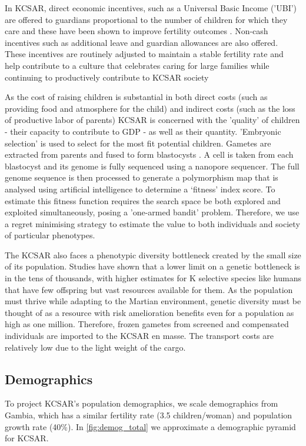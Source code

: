 \documentclass[fleqn,10pt]{Stylesheet} %
\begin{document}
In KCSAR, direct economic incentives, such as a Universal Basic Income ('UBI') are offered to guardians proportional to the number of children for which they care and these have been shown to improve fertility outcomes \cite{Kalwij, Bjorklund}. Non-cash incentives such as additional leave and guardian allowances are also offered. These incentives are routinely adjusted to maintain a stable fertility rate and help contribute to a culture that celebrates caring for large families while continuing to productively contribute to KCSAR society 
        
As the cost of raising children is substantial in both direct costs (such as providing food and atmosphere for the child) and indirect costs (such as the loss of productive labor of parents) KCSAR is concerned with the 'quality' of children - their capacity to contribute to GDP - as well as their quantity. 'Embryonic selection' is used to select for the most fit potential children. Gametes are extracted from parents and fused to form blastocysts \cite{Shulman}. A cell is taken from each blastocyst and its genome is fully sequenced using a nanopore sequencer. The full genome sequence is then processed to generate a polymorphism map that is analysed using artificial intelligence to determine a ‘fitness’ index score. To estimate this fitness function requires the search space be both explored and exploited simultaneously, posing a 'one-armed bandit' problem. Therefore, we use a regret minimising strategy to estimate the value to both individuals and society of particular phenotypes.

The KCSAR also faces a phenotypic diversity bottleneck created by the small size of its population. Studies have shown that a lower limit on a genetic bottleneck is in the tens of thousands, with higher estimates for K selective species like humans that have few offspring but vast resources available for them. As the population must thrive while adapting to the Martian environment, genetic diversity must be thought of as a resource with risk amelioration benefits even for a population as high as one million. Therefore, frozen gametes from screened and compensated individuals are imported to the KCSAR en masse. The transport costs are relatively low due to the light weight of the cargo.

\subsection{Demographics}
To project KCSAR's population demographics, we scale demographics from Gambia, which has a similar fertility rate (3.5 children/woman) and population growth rate (40\%). \cite{Gambia} In \ref{fig:demog_total} we approximate a demographic pyramid for KCSAR.
\end{document}
